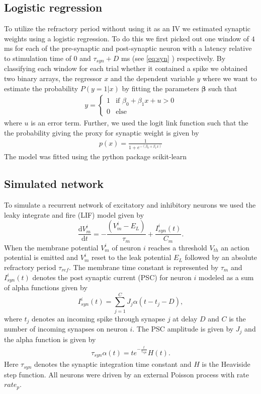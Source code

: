 \documentclass[11pt]{article}
\newcommand{\de}[2]{\frac{\mathrm{d} #1}{\mathrm{d} #2}}
\renewcommand{\vec}[1]{\boldsymbol{#1}}
\begin{document}
\subsection{Logistic regression}
To utilize the refractory period without using it as an IV we estimated synaptic weights using a logistic regression. To do this we first picked out one window of $ 4 $ ms for each of the pre-synaptic and post-synaptic neuron with a latency relative to stimulation time of $ 0 $ and $ \tau_{syn} + D $ ms (see \cref{eq:syn} ) respectively. By classifying each window for each trial whether it contained a spike we obtained two binary arrays, the regressor $ x $ and the dependent variable $ y $ where we want to estimate the probability $ P(y = 1|x) $ by fitting the parameters $ \vec{\beta} $ such that
\begin{align}
y = \begin{cases}
	1 & \text{if } \beta_0 + \beta_1x + u > 0\\
    0 & \text{else}
\end{cases}
\end{align}
where $ u $ is an error term. Further, we used the logit link function such that the the probability giving the proxy for synaptic weight is given by
\begin{align}
p(x) = \frac{1}{1 + e^{-(\beta_0 + \beta_1x)}}
\end{align}
The model was fitted using the python package scikit-learn \citep{scikit-learn}

\subsection{Simulated network}
To simulate a recurrent network of excitatory and inhibitory neurons we used the leaky integrate and fire (LIF) model given by
\begin{equation}
	\de{V_m^i}{t} = - \frac{(V_m^i - E_L)}{\tau_m} + \frac{I_{syn}^i(t)}{C_m}.
    \label{eq:LIF}
\end{equation}
When the membrane potential $ V_m^{i} $ of neuron $ i $ reaches a threshold $ V_{th} $ an action potential is emitted and $ V_m^{i} $ reset to the leak potential $ E_{L} $ followed by an absolute refractory period $ \tau_{ref} $. The membrane time constant is represented by $ \tau_{m} $ and $ I_{syn}^{i}(t) $ denotes the post synaptic current (PSC) for neuron $ i $ modeled as a sum of alpha functions given by
\begin{equation}
	\label{eq:syn}
	I_{syn}^i(t) = \sum_{j=1}^C J_j \alpha(t - t_j - D),
\end{equation}
where $ t_j $ denotes an incoming spike through synapse $ j $ at delay $ D $ and $ C $ is the number of incoming synapses on neuron $ i $. The PSC amplitude is given by $ J_{j} $ and the alpha function is given by
\begin{align}
\tau_{syn}\alpha(t) = te^{-\frac{t}{\tau_{syn}}} H(t).
\end{align}
Here $ \tau_{syn} $ denotes the synaptic integration time constant and $ H $ is the Heaviside step function. All neurons were driven by an external Poisson process with rate $ rate_{p} $.
\end{document}

